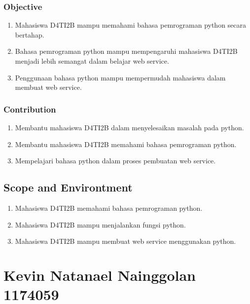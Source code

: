 \subsubsection{Objective}
\begin{enumerate}
	\item Mahasiswa D4TI2B mampu memahami bahasa pemrograman python secara bertahap.
	\item Bahasa pemrograman python mampu mempengaruhi mahasiswa D4TI2B menjadi lebih semangat dalam belajar web service.
	\item Penggunaan bahasa python mampu mempermudah mahasiswa dalam membuat web service.
\end{enumerate}
\subsubsection{Contribution}
\begin{enumerate}
	\item Membantu mahasiswa D4TI2B dalam menyelesaikan masalah pada python.
	\item Membantu mahasiswa D4TI2B memahami bahasa pemrograman python.
	\item Mempelajari bahasa python dalam proses pembuatan web service.
\end{enumerate}
		
\subsection{Scope and Environtment}
\begin{enumerate}
	\item Mahasiswa D4TI2B memahami bahasa pemrograman python.
	\item Mahasiswa D4TI2B mampu menjalankan fungsi python.
	\item Mahasiswa D4TI2B mampu membuat web service menggunakan python.
\end{enumerate}

\section{Kevin Natanael Nainggolan 1174059}
